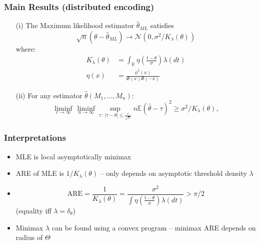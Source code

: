 \documentclass[mathserif]{beamer}
\begin{document}
\begin{frame}
\frametitle{Main Results (distributed encoding)}

\begin{theorem}
\begin{itemize}
\item[(i)] The Maximum likelihood estimator $\widehat{\theta}_{ML}$  satisfies
\[
\sqrt{n}(\theta - \widehat{\theta}_{ML}) \rightarrow \mathcal N\left(0,\sigma^2/K_\lambda(\theta) \right)
\]
where:
\begin{align*}
K_\lambda(\theta) & = \int_{\mathbb R} \eta\left( \frac{t-\theta}{\sigma}\right) \lambda(dt) \\
\eta(x) & = \frac{\phi^2(x)}{\Phi(x)\Phi(-x)}
\end{align*}
\pause
\item[(ii)] For any estimator $\widehat{\theta}(M_1,\ldots,M_n)$:
\[
\liminf_{c\rightarrow \infty}\, \liminf_{n\rightarrow \infty} \sup_{\tau\,:\,| \tau - \theta| \leq \frac{c}{\sqrt{n}} }  n \mathbb E \left(\widehat{\theta} - \tau \right)^2 \geq \sigma^2/K_\lambda(\theta),
\]

\end{itemize}
\end{theorem}
\end{frame}


\begin{frame}
\frametitle{Interpretations}
\begin{itemize}
\pause
\item MLE is local asymptotically minimax 
\pause
\item ARE of MLE is $1/K_{\lambda}(\theta)$ -- 
only depends on asymptotic threshold density $\lambda$
\pause
\item  
\[
\mathrm{ARE} = \frac{1}{K_{\lambda}(\theta)}  = \frac{\sigma^2}{\int \eta \left( \frac{t-\theta}{\sigma}\right) \lambda(dt)}
> \pi / 2
\]
(equality iff $\lambda = \delta_{\theta}$)
\pause
\item Minimax $\lambda$ can be found using a convex program -- minimax ARE  depends on radius of $\Theta$
%

\end{itemize}

\end{frame}
\end{document}
